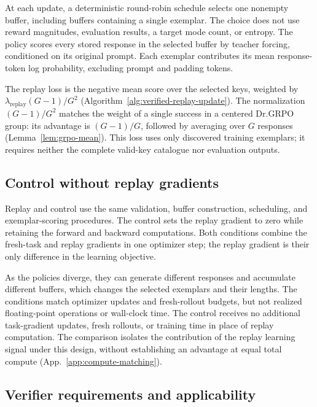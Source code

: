 At each update, a deterministic round-robin schedule selects one nonempty
buffer, including buffers containing a single exemplar. The choice does not
use reward magnitudes, evaluation results, a target mode count, or entropy.
The policy scores every stored response in the selected buffer by teacher
forcing, conditioned on its original prompt. Each exemplar contributes its
mean response-token log probability, excluding prompt and padding tokens.

The replay loss is the negative mean score over the selected keys,
weighted by $\lambda_{\mathrm{replay}}(G-1)/G^2$
(Algorithm~\ref{alg:verified-replay-update}). The normalization $(G-1)/G^2$
matches the weight of a single success in a centered Dr.GRPO group: its
advantage is $(G-1)/G$, followed by averaging over $G$ responses
(Lemma~\ref{lem:grpo-mean}). This loss uses only discovered training
exemplars; it requires neither the complete valid-key catalogue nor
evaluation outputs.

\subsection{Control without replay gradients}
\label{app:algorithm-control}

Replay and control use the same validation, buffer construction, scheduling,
and exemplar-scoring procedures. The control sets the replay gradient to
zero while retaining the forward and backward computations. Both conditions
combine the fresh-task and replay gradients in one optimizer step; the
replay gradient is their only difference in the learning objective.

As the policies diverge, they can generate different responses and accumulate
different buffers, which changes the selected exemplars and their lengths.
The conditions match optimizer updates and fresh-rollout budgets, but not
realized floating-point operations or wall-clock time. The control receives
no additional task-gradient updates, fresh rollouts, or training time in
place of replay computation. The comparison isolates the contribution of the
replay learning signal under this design, without establishing an advantage
at equal total compute (App.~\ref{app:compute-matching}).

\subsection{Verifier requirements and applicability}
\label{app:algorithm-identity}

